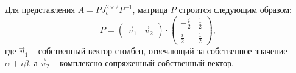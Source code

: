 	Для представления $A = P J^{2 \times 2}_c P^{-1}$, матрица $P$ строится следующим образом:
	\[ P = \begin{pmatrix} \vec{v}_1 & \vec{v}_2 \end{pmatrix} \cdot \begin{pmatrix} -\frac{i}{2} & \frac{1}{2} \\ \frac{i}{2} & \frac{1}{2} \end{pmatrix}, \]
	где $\vec{v}_1$ -- собственный вектор-столбец, отвечающий за собственное значение $\alpha + i \beta$, а $\vec{v}_2$ -- комплексно-сопряженный собственный вектор.


